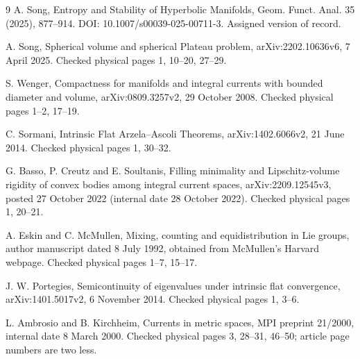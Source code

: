 \documentclass[10pt]{article}
\begin{document}
9 A. Song, Entropy and Stability of Hyperbolic Manifolds, Geom. Funct. Anal. 35 (2025), 877–914. DOI: 10.1007/s00039-025-00711-3. Assigned version of record.\par
A. Song, Spherical volume and spherical Plateau problem, arXiv:2202.10636v6, 7 April 2025. Checked physical pages 1, 10–20, 27–29.\par
S. Wenger, Compactness for manifolds and integral currents with bounded diameter and volume, arXiv:0809.3257v2, 29 October 2008. Checked physical pages 1–2, 17–19.\par
C. Sormani, Intrinsic Flat Arzela–Ascoli Theorems, arXiv:1402.6066v2, 21 June 2014. Checked physical pages 1, 30–32.\par
G. Basso, P. Creutz and E. Soultanis, Filling minimality and Lipschitz-volume rigidity of convex bodies among integral current spaces, arXiv:2209.12545v3, posted 27 October 2022 (internal date 28 October 2022). Checked physical pages 1, 20–21.\par
A. Eskin and C. McMullen, Mixing, counting and equidistribution in Lie groups, author manuscript dated 8 July 1992, obtained from McMullen’s Harvard webpage. Checked physical pages 1–7, 15–17.\par
J. W. Portegies, Semicontinuity of eigenvalues under intrinsic flat convergence, arXiv:1401.5017v2, 6 November 2014. Checked physical pages 1, 3–6.\par
L. Ambrosio and B. Kirchheim, Currents in metric spaces, MPI preprint 21/2000, internal date 8 March 2000. Checked physical pages 3, 28–31, 46–50; article page numbers are two less.\par
\end{document}
